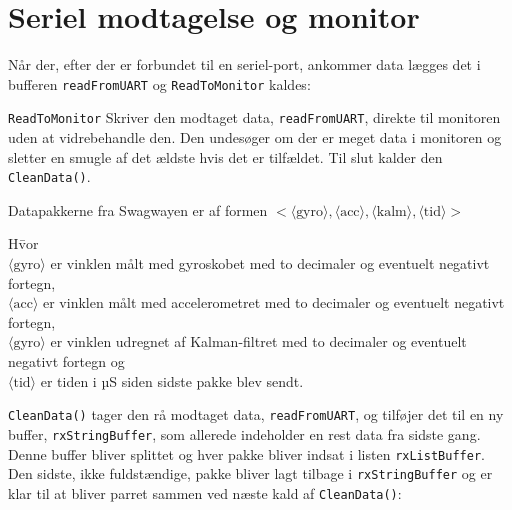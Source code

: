 \documentclass[a4paper,oneside,article,danish,table]{memoir}
\newcommand{\form}[2]{}
\begin{document}
\section{Seriel modtagelse og monitor}
Når der, efter der er forbundet til en seriel-port, ankommer data lægges det i bufferen \texttt{readFromUART} og \texttt{ReadToMonitor} kaldes:
\form{131}{136}
\texttt{ReadToMonitor} Skriver den modtaget data, \texttt{readFromUART}, direkte til monitoren uden at vidrebehandle den. Den undesøger om der er meget data i monitoren og sletter en smugle af det ældste hvis det er tilfældet. Til slut kalder den \texttt{CleanData()}.
\form{138}{149}
Datapakkerne fra Swagwayen er af formen $<\langle \text{gyro} \rangle,\langle \text{acc} \rangle,\langle \text{kalm} \rangle,\langle \text{tid} \rangle>$
\begin{tabbing}
H\=vor\\
\> $\langle \text{gyro} \rangle$ er vinklen målt med gyroskobet med to decimaler og eventuelt negativt fortegn,\\
\> $\langle \text{acc} \rangle$ er vinklen målt med accelerometret med to decimaler og eventuelt negativt fortegn,\\
\> $\langle \text{gyro} \rangle$ er vinklen udregnet af Kalman-filtret  med to decimaler og eventuelt negativt fortegn og\\
\> $\langle \text{tid} \rangle$ er tiden i µS siden sidste pakke blev sendt.
\end{tabbing}
\texttt{CleanData()} tager den rå modtaget data, \texttt{readFromUART}, og tilføjer det til en ny buffer, \texttt{rxStringBuffer}, som allerede indeholder en rest data fra sidste gang. Denne buffer bliver splittet og hver pakke bliver indsat i listen \texttt{rxListBuffer}. Den sidste, ikke fuldstændige, pakke bliver lagt tilbage i \texttt{rxStringBuffer} og er klar til at bliver parret sammen ved næste kald af \texttt{CleanData()}:
\form{151}{157}

%
\end{document}
